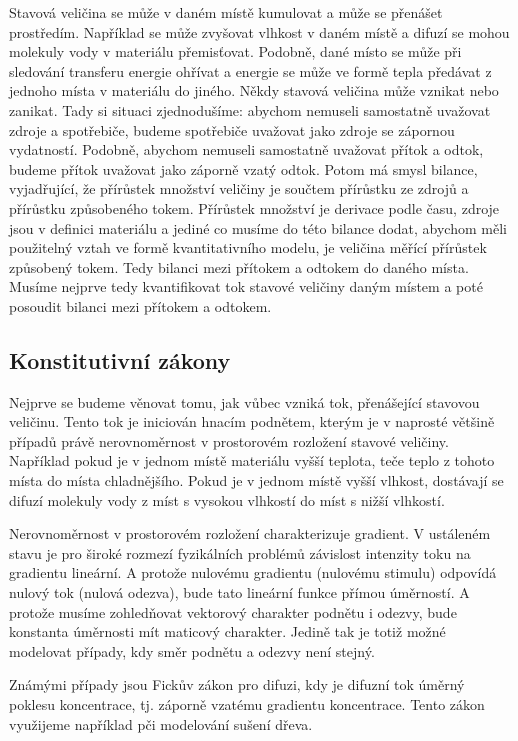 \documentclass[12pt]{article}
\begin{document}
Stavová veličina se může v daném místě kumulovat a může se přenášet prostředím. Například se může zvyšovat vlhkost v daném místě a difuzí se mohou molekuly vody v materiálu přemisťovat. Podobně, dané místo se může při sledování transferu energie ohřívat a energie se může ve formě tepla předávat z jednoho místa v materiálu do jiného. Někdy stavová veličina může vznikat nebo zanikat. Tady si situaci zjednodušíme: abychom nemuseli samostatně uvažovat zdroje a spotřebiče, budeme spotřebiče uvažovat jako zdroje se zápornou vydatností. Podobně, abychom nemuseli samostatně uvažovat přítok a odtok, budeme přítok uvažovat jako záporně vzatý odtok. Potom má smysl bilance, vyjadřující, že přírůstek množství veličiny je součtem přírůstku ze zdrojů a přírůstku způsobeného tokem. Přírůstek množství je derivace podle času, zdroje jsou v definici materiálu a jediné co musíme do této bilance dodat, abychom měli použitelný vztah ve formě kvantitativního modelu, je veličina měřící přírůstek způsobený tokem. Tedy bilanci mezi přítokem a odtokem do daného místa. Musíme nejprve tedy kvantifikovat tok stavové veličiny daným místem a poté posoudit bilanci mezi přítokem a odtokem. 

\subsection{Konstitutivní zákony}

Nejprve se budeme věnovat tomu, jak vůbec vzniká tok, přenášející stavovou veličinu. Tento tok je iniciován hnacím podnětem, kterým je v naprosté většině případů právě nerovnoměrnost v prostorovém rozložení stavové veličiny. Například pokud je v jednom místě materiálu vyšší teplota, teče teplo z tohoto místa do místa chladnějšího. Pokud je v jednom místě vyšší vlhkost, dostávají se difuzí molekuly vody z míst s vysokou vlhkostí do míst s nižší vlhkostí.

Nerovnoměrnost v prostorovém rozložení charakterizuje gradient. V ustáleném stavu je pro široké rozmezí fyzikálních problémů závislost intenzity toku na gradientu lineární. A protože nulovému gradientu (nulovému stimulu) odpovídá nulový tok (nulová odezva), bude tato lineární funkce přímou úměrností. A protože musíme zohledňovat vektorový charakter podnětu i odezvy, bude konstanta úměrnosti mít maticový charakter. Jedině tak je totiž možné modelovat případy, kdy směr podnětu a odezvy není stejný.

Známými případy jsou Fickův zákon pro difuzi, kdy je difuzní tok úměrný poklesu koncentrace, tj. záporně vzatému gradientu koncentrace. Tento zákon využijeme například pči modelování sušení dřeva.
\end{document}
